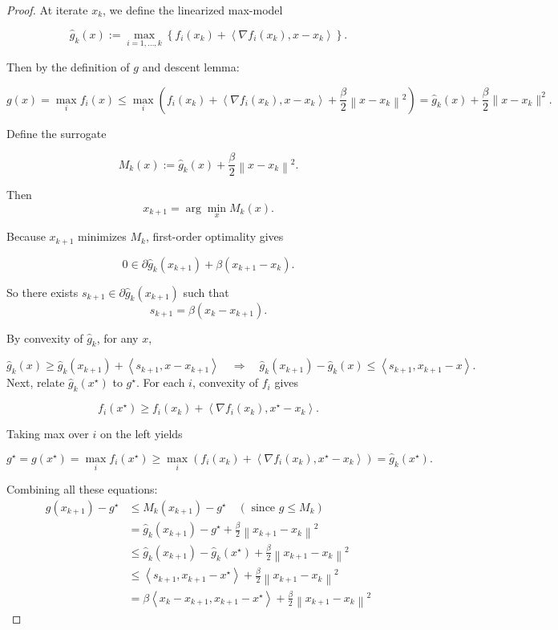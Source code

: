 \documentclass[en,hazy,blue,12pt,normal]{elegantnote}
\begin{document}
\begin{proof}
    At iterate $x_k$, we define the linearized max-model

$$
\widehat{g}_k(x):=\max _{i=1, \ldots, k}\left\{f_i\left(x_k\right)+\left\langle\nabla f_i\left(x_k\right), x-x_k\right\rangle\right\} .
$$

Then by the definition of $g$ and descent lemma:

\[g(x)=\max _i f_i(x) \leq \max _i\left(f_i\left(x_k\right)+\left\langle\nabla f_i\left(x_k\right), x-x_k\right\rangle+\frac{\beta}{2}\left\|x-x_k\right\|^2\right)=\widehat{g}_k(x)+\frac{\beta}{2} \| x-x_k \|^2 .\]

Define the surrogate

$$
M_k(x):=\widehat{g}_k(x)+\frac{\beta}{2}\left\|x-x_k\right\|^2 .
$$

Then
\[x_{k+1}=\arg \min _x M_k(x) .\]

Because $x_{k+1}$ minimizes $M_k$, first-order optimality gives

$$
0 \in \partial \widehat{g}_k\left(x_{k+1}\right)+\beta\left(x_{k+1}-x_k\right) .
$$

So there exists $s_{k+1} \in \partial \widehat{g}_k\left(x_{k+1}\right)$ such that
\[s_{k+1}=\beta\left(x_k-x_{k+1}\right) .\]

By convexity of $\widehat{g}_k$, for any $x$,

$$
\widehat{g}_k(x) \geq \widehat{g}_k\left(x_{k+1}\right)+\left\langle s_{k+1}, x-x_{k+1}\right\rangle \quad \Longrightarrow \quad \widehat{g}_k\left(x_{k+1}\right)-\widehat{g}_k(x) \leq\left\langle s_{k+1}, x_{k+1}-x\right\rangle .
$$
Next, relate $\widehat{g}_k\left(x^{\star}\right)$ to $g^{\star}$. For each $i$, convexity of $f_i$ gives

$$
f_i\left(x^{\star}\right) \geq f_i\left(x_k\right)+\left\langle\nabla f_i\left(x_k\right), x^{\star}-x_k\right\rangle .
$$


Taking max over $i$ on the left yields

$$
g^{\star}=g\left(x^{\star}\right)=\max _i f_i\left(x^{\star}\right) \geq \max _i\left(f_i\left(x_k\right)+\left\langle\nabla f_i\left(x_k\right), x^{\star}-x_k\right\rangle\right)=\widehat{g}_k\left(x^{\star}\right) .
$$

Combining all these equations:
\[
\begin{aligned}
g\left(x_{k+1}\right)-g^{\star} & \leq M_k\left(x_{k+1}\right)-g^{\star} \quad\left(\text { since } g \leq M_k\right) \\
& =\widehat{g}_k\left(x_{k+1}\right)-g^{\star}+\frac{\beta}{2}\left\|x_{k+1}-x_k\right\|^2 \\
& \leq \widehat{g}_k\left(x_{k+1}\right)-\widehat{g}_k\left(x^{\star}\right)+\frac{\beta}{2}\left\|x_{k+1}-x_k\right\|^2 \\
& \leq\left\langle s_{k+1}, x_{k+1}-x^{\star}\right\rangle+\frac{\beta}{2}\left\|x_{k+1}-x_k\right\|^2 \\
& =\beta\left\langle x_k-x_{k+1}, x_{k+1}-x^{\star}\right\rangle+\frac{\beta}{2}\left\|x_{k+1}-x_k\right\|^2
\end{aligned}
\]


\end{proof}
\end{document}
